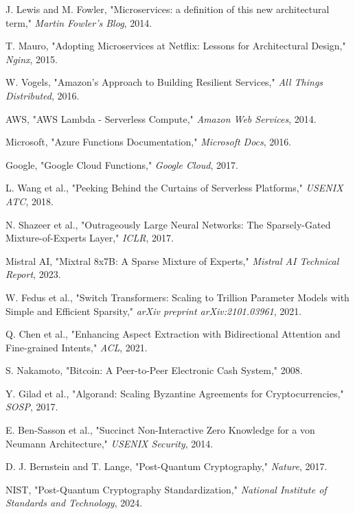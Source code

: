 \documentclass[11pt,a4paper]{article}
\begin{document}

\begin{thebibliography}{99}

 J. Lewis and M. Fowler, "Microservices: a definition of this new architectural term," \textit{Martin Fowler's Blog}, 2014.

 T. Mauro, "Adopting Microservices at Netflix: Lessons for Architectural Design," \textit{Nginx}, 2015.

 W. Vogels, "Amazon's Approach to Building Resilient Services," \textit{All Things Distributed}, 2016.

 AWS, "AWS Lambda - Serverless Compute," \textit{Amazon Web Services}, 2014.

 Microsoft, "Azure Functions Documentation," \textit{Microsoft Docs}, 2016.

 Google, "Google Cloud Functions," \textit{Google Cloud}, 2017.

 L. Wang et al., "Peeking Behind the Curtains of Serverless Platforms," \textit{USENIX ATC}, 2018.

 N. Shazeer et al., "Outrageously Large Neural Networks: The Sparsely-Gated Mixture-of-Experts Layer," \textit{ICLR}, 2017.

 Mistral AI, "Mixtral 8x7B: A Sparse Mixture of Experts," \textit{Mistral AI Technical Report}, 2023.

 W. Fedus et al., "Switch Transformers: Scaling to Trillion Parameter Models with Simple and Efficient Sparsity," \textit{arXiv preprint arXiv:2101.03961}, 2021.

 Q. Chen et al., "Enhancing Aspect Extraction with Bidirectional Attention and Fine-grained Intents," \textit{ACL}, 2021.

 S. Nakamoto, "Bitcoin: A Peer-to-Peer Electronic Cash System," 2008.

 Y. Gilad et al., "Algorand: Scaling Byzantine Agreements for Cryptocurrencies," \textit{SOSP}, 2017.

 E. Ben-Sasson et al., "Succinct Non-Interactive Zero Knowledge for a von Neumann Architecture," \textit{USENIX Security}, 2014.

 D. J. Bernstein and T. Lange, "Post-Quantum Cryptography," \textit{Nature}, 2017.

 NIST, "Post-Quantum Cryptography Standardization," \textit{National Institute of Standards and Technology}, 2024.


\end{thebibliography}
\end{document}

